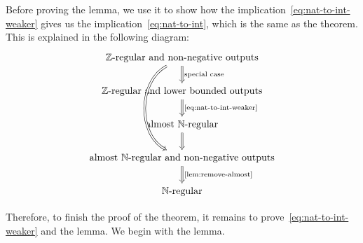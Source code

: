     Before proving the lemma, we use it to show how the implication~\eqref{eq:nat-to-int-weaker} gives us the implication~\eqref{eq:nat-to-int}, which is the same as the theorem. This is explained in the following diagram:
    \[
    \begin{tikzcd}
    \text{$\Int$-regular and  non-negative outputs}
    \ar[d,Rightarrow, "\text{special case}"]
    \ar[ddd,Rightarrow,  bend right=62]
    \\
 \text{$\Int$-regular and lower bounded outputs} 
\ar[d,Rightarrow, "\text{\eqref{eq:nat-to-int-weaker}}"] \\
 \text{almost $\Nat$-regular}
\ar[d,Rightarrow]
\\
\text{almost $\Nat$-regular and non-negative outputs}
\ar[d,Rightarrow, "\text{\cref{lem:remove-almost}}"] 
\\
 \text{$\Nat$-regular}
    \end{tikzcd}
    \]

    Therefore, to finish the proof of the theorem, it remains to prove~\eqref{eq:nat-to-int-weaker} and the lemma. We begin with the lemma.

